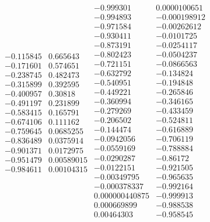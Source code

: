 \documentclass{watsonbook}
\begin{document}
\begin{aexercise}
{$$\begin{array}{cc}
      -0.115845 & 0.665643 \\
      -0.171601 & 0.574651 \\
      -0.238745 & 0.482473 \\
      -0.315899 & 0.392595 \\
      -0.400957 & 0.30818 \\
      -0.491197 & 0.231899 \\
      -0.583415 & 0.165791 \\
      -0.674106 & 0.111162 \\
      -0.759645 & 0.0685255 \\
      -0.836489 & 0.0375914 \\
      -0.901371 & 0.0172975 \\
      -0.951479 & 0.00589015 \\
      -0.984611 & 0.00104315 
    \end{array}
    \begin{array}{cc}
      -0.999301 & 0.0000100651 \\
      -0.994893 & -0.000198912 \\
      -0.971584 & -0.00262612 \\
      -0.930411 & -0.0101725 \\
      -0.873191 & -0.0254117 \\
      -0.802423 & -0.0504237 \\
      -0.721151 & -0.0866563 \\
      -0.632792 & -0.134824 \\
      -0.540951 & -0.194848 \\
      -0.449221 & -0.265846 \\
      -0.360994 & -0.346165 \\
      -0.279269 & -0.433459 \\
      -0.206502 & -0.524811 \\
      -0.144474 & -0.616889 \\
      -0.0942056 & -0.706119 \\
      -0.0559169 & -0.788884 \\
      -0.0290287 & -0.86172 \\
      -0.0122151 & -0.921505 \\
      -0.00349795 & -0.965635 \\
      -0.000378337 & -0.992164 \\
      0.000000440875 & -0.999913 \\
      0.000669899 & -0.988538 \\
      0.00464303 & -0.958545 \\

\end{array}$$}
\end{aexercise}
\end{document}
